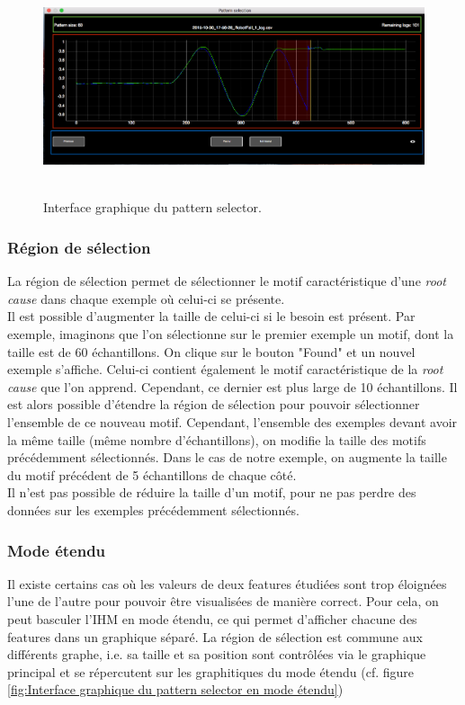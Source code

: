 \begin{figure}[H]
	\centering\includegraphics[height=6.4cm]{images/pattern_selector.png}
	\caption[Interface graphique du pattern selector]{Interface graphique du pattern selector.}
	\label{fig:Interface graphique du pattern selector}
\end{figure}

\subsubsection{Région de sélection}
\label{Industrialisation du produit: Outils graphiques: Pattern selection: La région de sélection}
La région de sélection permet de sélectionner le motif caractéristique d'une \emph{root cause} dans chaque exemple où celui-ci se présente. \\
 Il est possible d'augmenter la taille de celui-ci si le besoin est présent. Par exemple, imaginons que l'on sélectionne sur le premier exemple un motif, dont la taille est de 60 échantillons. On clique sur le bouton "Found" et un nouvel exemple s'affiche. Celui-ci contient également le motif caractéristique de la \emph{root cause} que l'on apprend. Cependant, ce dernier est plus large de 10 échantillons. Il est alors possible d'étendre la région de sélection pour pouvoir sélectionner l'ensemble de ce nouveau motif. Cependant, l'ensemble des exemples devant avoir la même taille (même nombre d'échantillons), on modifie la taille des motifs précédemment sélectionnés. Dans le cas de notre exemple, on augmente la taille du motif précédent de 5 échantillons de chaque côté. \\
Il n'est pas possible de réduire la taille d'un motif, pour ne pas perdre des données sur les exemples précédemment sélectionnés. 

\subsubsection{Mode étendu}
\label{Industrialisation du produit: Outils graphiques: Pattern selection: Mode étendu}
Il existe certains cas où les valeurs de deux features étudiées sont trop éloignées l'une de l'autre pour pouvoir être visualisées de manière correct. Pour cela, on peut basculer l'IHM en mode étendu, ce qui permet d'afficher chacune des features dans un graphique séparé. La région de sélection est commune aux différents graphe, i.e. sa taille et sa position sont contrôlées via le graphique principal et se répercutent sur les graphitiques du mode étendu (cf. figure \ref{fig:Interface graphique du pattern selector en mode étendu})

